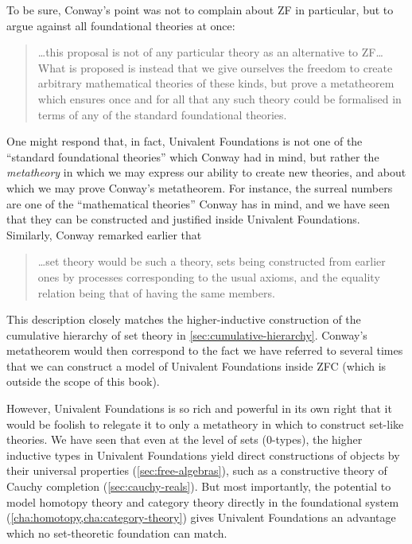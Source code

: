 To be sure, Conway's point was not to complain about ZF in particular, but to argue against all foundational theories at once:
\begin{quote}\footnotesize
  \dots this proposal is not of any particular theory as an alternative to ZF\dots{}
  What is proposed is instead that we give ourselves the freedom to create arbitrary mathematical theories of these kinds, but prove a metatheorem which ensures once and for all that any such theory could be formalised in terms of any of the standard foundational theories.
\end{quote}
One might respond that, in fact, Univalent Foundations is not one of the ``standard foundational theories'' which Conway had in mind, but rather the \emph{metatheory} in which we may express our ability to create new theories, and about which we may prove Conway's metatheorem.
For instance, the surreal numbers are one of the ``mathematical theories'' Conway has in mind, and we have seen that they can be constructed and justified inside Univalent Foundations.
Similarly, Conway remarked earlier that
\begin{quote}\footnotesize
  \dots set theory would be such a theory, sets being constructed from earlier ones by processes corresponding to the usual axioms, and the equality relation being that of having the same members.
\end{quote}
This description closely matches the higher-inductive construction of the cumulative hierarchy of set theory in \autoref{sec:cumulative-hierarchy}.
Conway's metatheorem would then correspond to the fact we have referred to several times that we can construct a model of Univalent Foundations inside ZFC (which is outside the scope of this book).

However, Univalent Foundations is so rich and powerful in its own right that it would be foolish to relegate it to only a metatheory in which to construct set-like theories.
We have seen that even at the level of sets (0-types), the higher inductive types in Univalent Foundations yield direct constructions of objects by their universal properties (\autoref{sec:free-algebras}), such as a constructive theory of Cauchy completion (\autoref{sec:cauchy-reals}).
But most importantly, the potential to model homotopy theory and category theory directly in the foundational system (\autoref{cha:homotopy,cha:category-theory}) gives Univalent Foundations an advantage which no set-theoretic foundation can match.


\sectionNotes

